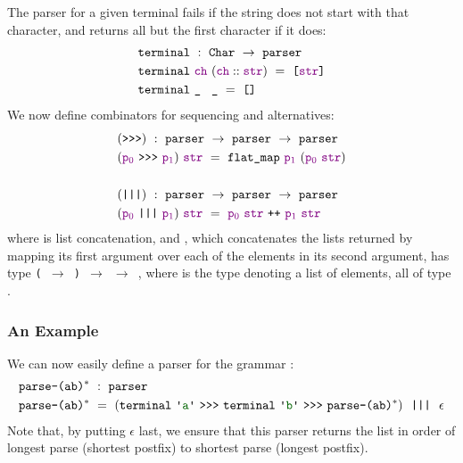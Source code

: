       The parser for a given terminal fails if the string does not start with that character, and returns all but the first character if it does:
\begin{align*}
&\fname{terminal}~:~\indname{Char}~\to~\fname{parser}\\
&\fname{terminal}~\farg{ch}~(\cons{\farg{ch}}{\farg{str}})~=~\valuelist{\farg{str}} \\
&\fname{terminal}~\aswidthof{\termhole}{\farg{ch}}~\termhole~=~\nil
\end{align*}
      We now define combinators for sequencing and alternatives:
\newcommand{\sequencing}{\fname{>{}>{}>}}
\begin{align*}
&(\sequencing)~:~\fname{parser}~\to~\fname{parser}~\to~\fname{parser}\\
&(\farg{p\ensuremath{_0}}~\sequencing~\farg{p\ensuremath{_1}})~\farg{str}~=~\fname{flat\_map}~\farg{p\ensuremath{_1}}~(\farg{p\ensuremath{_0}}~\farg{str}) \\ \\
&(\fname{|||})~:~\fname{parser}~\to~\fname{parser}~\to~\fname{parser}\\
&(\farg{p\ensuremath{_0}}~\fname{|||}~\farg{p\ensuremath{_1}})~\farg{str}~=~\farg{p\ensuremath{_0}}~\farg{str}~\fname{++}~\farg{p\ensuremath{_1}}~\farg{str}
\end{align*}
      where \fname{++} is list concatenation, and , which concatenates the lists returned by mapping its first argument over each of the elements in its second argument, has type \texttt{( $\to$ ) $\to$  $\to$ }, where  is the type denoting a list of elements, all of type .
      
    \subsubsection{An Example}
    
      We can now easily define a parser for the grammar :
\begin{align*}
&\fname{parse-\regex{(ab)\ensuremath{^*}}}~:~\fname{parser} \\
&\fname{parse-\regex{(ab)\ensuremath{^*}}}~=~(\fname{terminal}~\terminal{a}~\sequencing~\fname{terminal}~\terminal{b}~\sequencing~\fname{parse-\regex{(ab)\ensuremath{^*}}})~~\fname{|||}~~\epsilon
\end{align*}
      Note that, by putting $\epsilon$ last, we ensure that this parser returns the list in order of longest parse (shortest postfix) to shortest parse (longest postfix).
      

